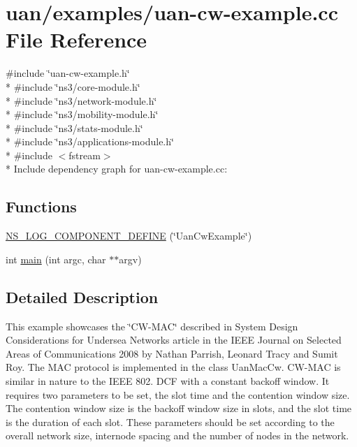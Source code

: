 \hypertarget{uan-cw-example_8cc}{}\section{uan/examples/uan-\/cw-\/example.cc File Reference}
\label{uan-cw-example_8cc}
{\ttfamily \#include \char`\"{}uan-\/cw-\/example.\+h\char`\"{}}\\*
{\ttfamily \#include \char`\"{}ns3/core-\/module.\+h\char`\"{}}\\*
{\ttfamily \#include \char`\"{}ns3/network-\/module.\+h\char`\"{}}\\*
{\ttfamily \#include \char`\"{}ns3/mobility-\/module.\+h\char`\"{}}\\*
{\ttfamily \#include \char`\"{}ns3/stats-\/module.\+h\char`\"{}}\\*
{\ttfamily \#include \char`\"{}ns3/applications-\/module.\+h\char`\"{}}\\*
{\ttfamily \#include $<$fstream$>$}\\*
Include dependency graph for uan-\/cw-\/example.cc\+:
\subsection*{Functions}
\begin{DoxyCompactItemize}
\item 
\hyperlink{uan-cw-example_8cc_a02739e5591c200568f56ba0c60dcab1a}{N\+S\+\_\+\+L\+O\+G\+\_\+\+C\+O\+M\+P\+O\+N\+E\+N\+T\+\_\+\+D\+E\+F\+I\+NE} (\char`\"{}Uan\+Cw\+Example\char`\"{})
\item 
int \hyperlink{uan-cw-example_8cc_a3c04138a5bfe5d72780bb7e82a18e627}{main} (int argc, char $\ast$$\ast$argv)
\end{DoxyCompactItemize}


\subsection{Detailed Description}
This example showcases the \char`\"{}\+C\+W-\/\+M\+A\+C\char`\"{} described in System Design Considerations for Undersea Networks article in the I\+E\+EE Journal on Selected Areas of Communications 2008 by Nathan Parrish, Leonard Tracy and Sumit Roy. The M\+AC protocol is implemented in the class Uan\+Mac\+Cw. C\+W-\/\+M\+AC is similar in nature to the I\+E\+EE 802. D\+CF with a constant backoff window. It requires two parameters to be set, the slot time and the contention window size. The contention window size is the backoff window size in slots, and the slot time is the duration of each slot. These parameters should be set according to the overall network size, internode spacing and the number of nodes in the network.

